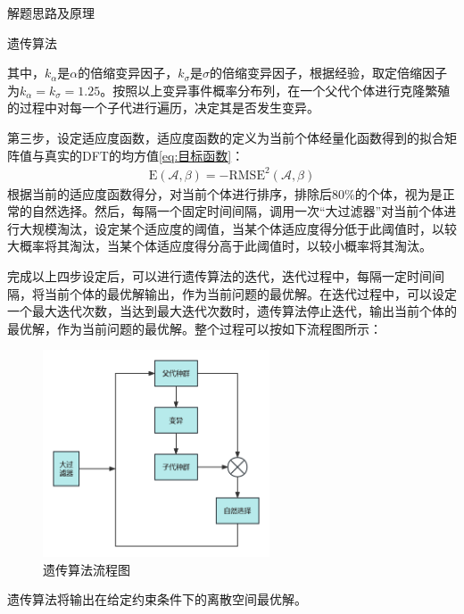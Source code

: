 \documentclass[11pt]{article}
\begin{document}
\begin{section}{解题思路及原理}
\begin{subsection}{遗传算法}
\begin{table}[H]
   \end{table}
   \par
   其中，$k_\alpha$是$\alpha$的倍缩变异因子，$k_\sigma$是$\sigma$的倍缩变异因子，根据经验，取定倍缩因子为$k_\alpha=k_\sigma=1.25$。按照以上变异事件概率分布列，在一个父代个体进行克隆繁殖的过程中对每一个子代进行遍历，决定其是否发生变异。\par
   第三步，设定适应度函数，适应度函数的定义为当前个体经量化函数得到的拟合矩阵值与真实的DFT的均方值\ref{eq:目标函数}：
   \begin{align}
     \mathrm{E}(\mathcal{A},\beta)=-\mathrm{RMSE}^2(\mathcal{A},\beta)
   \end{align}
   根据当前的适应度函数得分，对当前个体进行排序，排除后80\%的个体，视为是正常的自然选择。然后，每隔一个固定时间间隔，调用一次“大过滤器”对当前个体进行大规模淘汰，设定某个适应度的阈值，当某个体适应度得分低于此阈值时，以较大概率将其淘汰，当某个体适应度得分高于此阈值时，以较小概率将其淘汰。\par
   完成以上四步设定后，可以进行遗传算法的迭代，迭代过程中，每隔一定时间间隔，将当前个体的最优解输出，作为当前问题的最优解。在迭代过程中，可以设定一个最大迭代次数，当达到最大迭代次数时，遗传算法停止迭代，输出当前个体的最优解，作为当前问题的最优解。整个过程可以按如下流程图所示：
   \begin{figure}[H]
     \centering
     \includegraphics[width=0.6\textwidth]{遗传算法流程.png}
     \caption{遗传算法流程图}
     \label{fig:遗传算法流程图}
   \end{figure}
   \par
   遗传算法将输出在给定约束条件下的离散空间最优解。
 \end{subsection}
\end{section}
\end{document}
